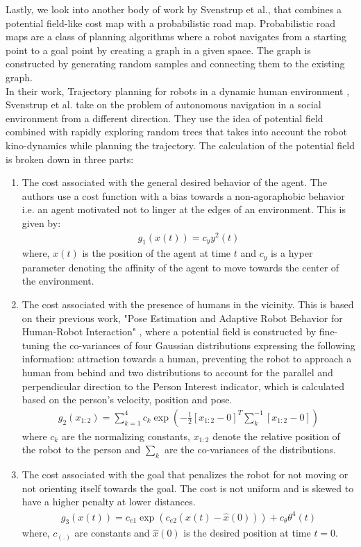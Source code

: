 Lastly, we look into another body of work by Svenstrup et al., that combines a potential field-like cost map with a probabilistic road map. Probabilistic road maps are a class of planning algorithms where a robot navigates from a starting point to a goal point by creating a graph in a given space. The graph is constructed by generating random samples and connecting them to the existing graph.\\
In their work, Trajectory planning for robots in a dynamic human environment \cite{svenstrup_trajectory_2010}, Svenstrup et al. take on the problem of autonomous navigation in a social environment from a different direction. They use the idea of potential field combined with rapidly exploring random trees that takes into account the robot kino-dynamics while planning the trajectory.
The calculation of the potential field is broken down in three parts:
\begin{enumerate}
	\item The cost associated with the general desired behavior of the agent. The authors use a cost function with a bias towards a non-agoraphobic behavior i.e. an agent motivated not to linger at the edges of an environment. This is given by:
	\begin{align}
	g_{1}(x(t)) = c_{y}y^{2}(t)
	\end{align}
	where, $x(t)$ is the position of the agent at time $t$ and $c_y$ is a hyper parameter denoting the affinity of the agent to move towards the center of the environment.
	\item The cost associated with the presence of humans in the vicinity. This is based on their previous work, "Pose Estimation and Adaptive Robot Behavior for Human-Robot Interaction" \cite{svenstrup_pose_estimation_2009}, where a potential field is constructed by fine-tuning the co-variances of four Gaussian distributions expressing the following information: attraction towards a human, preventing the robot to approach a human from behind and two distributions to account for the parallel and perpendicular direction to the Person Interest indicator, which is calculated based on the person's velocity, position and pose.  
	\begin{align}
	g_{2}(x_{1:2}) = \sum_{k=1}^{4}c_{k}\exp(-\frac{1}{2}[x_{1:2} - 0]^{T}\sum^{-1}_{k}[x_{1:2} - 0])
	\end{align} 
	where $c_{k}$ are the normalizing constants, $x_{1:2}$ denote the relative position of the robot to the person and $\sum_k$ are the co-variances of the distributions.
	\item The cost associated with the goal that penalizes the robot for not moving or not orienting itself towards the goal. The cost is not uniform and is skewed to have a higher penalty at lower distances.
	\begin{align}
	g_{3}(x(t)) = c_{e1}\exp(c_{e2}(x(t) - \hat{x}(0))) + c_{\theta}\theta^{4}(t)
	\end{align}
	where, $c_{(.)}$ are constants and $\hat{x}(0)$ is the desired position at time $t=0$.
\end{enumerate}


